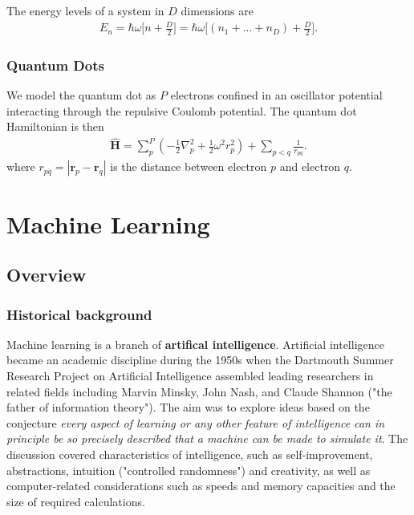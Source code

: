 \documentclass[twoside,english]{uiofysmaster}
\begin{document}
The energy levels of a system in $D$ dimensions are
\begin{align}
	E_n = \hbar \omega \Big[ n + \frac{D}{2}  \Big]=\hbar \omega \Big[ (n_1 + ... + n_D) + \frac{D}{2}  \Big] .
\end{align}

\subsection{Quantum Dots}
We model the quantum dot as $P$ electrons confined in an oscillator potential interacting through the repulsive Coulomb potential. The quantum dot Hamiltonian is then  \cite{HjortJensen2015}
\begin{align}
	\hat{\mathbf{H}} = \sum_p^P (-\frac{1}{2}\nabla_p^2 + \frac{1}{2}\omega^2 r_p^2 ) + \sum_{p<q} \frac{1}{r_{pq}} .
\end{align}
where $r_{pq}= |\bm{r}_p - \bm{r}_q|$ is the distance between electron $p$ and electron $q$.















\chapter{Machine Learning}
\section{Overview}
\subsection{Historical background}
\label{sec:MLhistory}
Machine learning is a branch of \textbf{artifical intelligence}. Artificial intelligence became an academic discipline during the 1950s when the Dartmouth Summer Research Project on Artificial Intelligence assembled leading researchers in related fields including Marvin Minsky, John Nash, and Claude Shannon ("the father of information theory"). The aim was to explore ideas based on the conjecture \textit{every aspect of learning or any other feature of intelligence can in principle be so precisely described that a machine can be made to simulate it}. The discussion covered characteristics of intelligence, such as self-improvement, abstractions, intuition ("controlled randomness") and creativity, as well as computer-related considerations such as speeds and memory capacities and the size of required calculations.
\end{document}
